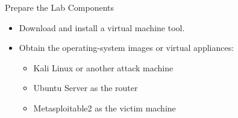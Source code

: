 \begin{frame}{Prepare the Lab Components}
  \begin{itemize}
    \item Download and install a virtual machine tool.
    \item Obtain the operating-system images or virtual appliances:
      \begin{itemize}
        \item Kali Linux or another attack machine
        \item Ubuntu Server as the router
        \item Metasploitable2 as the victim machine
      \end{itemize}
  \end{itemize}
\end{frame}
